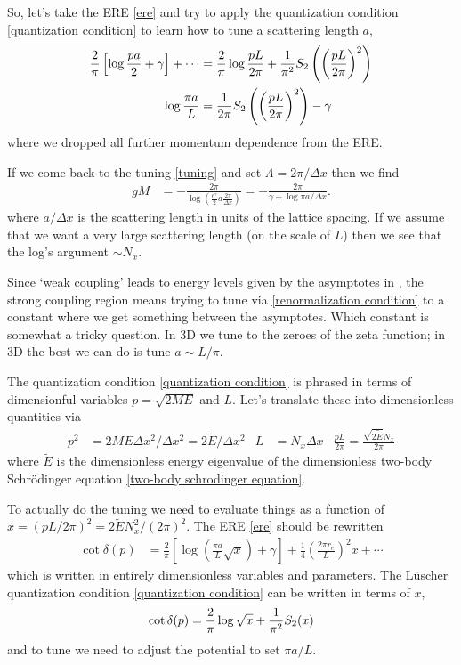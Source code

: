 So, let's take the ERE \eqref{ere} and try to apply the quantization condition \eqref{quantization condition} to learn how to tune a scattering length $a$,
\begin{align}
	\frac{2}{\pi} \left[\log\frac{pa}{2} + \gamma \right] + \cdots
	&=
	\frac{2}{\pi} \log \frac{pL}{2\pi} + \frac{1}{\pi^2} S_2\left(\left(\frac{pL}{2\pi}\right)^2\right)
	\\
	\log \frac{\pi a}{L} &= \frac{1}{2\pi} S_2\left(\left(\frac{pL}{2\pi}\right)^2\right) - \gamma
	\label{eq:renormalization condition}
\end{align}
where we dropped all further momentum dependence from the ERE.

If we come back to the tuning \eqref{tuning} and set $\Lambda=2\pi/\Delta x$ then we find
\begin{align}
	gM
	&= - \frac{2\pi}{\log\left(\frac{e^\gamma}{2} a \frac{2\pi}{\Delta x}\right)}
	= -\frac{2\pi}{\gamma + \log \pi a / \Delta x}.
\end{align}
where $a/\Delta x$ is the scattering length in units of the lattice spacing.
If we assume that we want a very large scattering length (on the scale of $L$) then we see that the log's argument $\sim N_x$.

Since `weak coupling' leads to energy levels given by the asymptotes in , the strong coupling region means trying to tune via \eqref{renormalization condition} to a constant where we get something between the asymptotes.
Which constant is somewhat a tricky question.
In 3D we tune to the zeroes of the zeta function; in 3D the best we can do is tune $a \sim L/\pi$.

The quantization condition \eqref{quantization condition} is phrased in terms of dimensionful variables $p=\sqrt{2ME}$ and $L$.
Let's translate these into dimensionless quantities via
\begin{align}
    p^2 &= 2 M E \Delta x^2 / \Delta x^2 = 2 \tilde{E} / \Delta x^2
	&
	L &= N_x \Delta x
    &
    \frac{pL}{2\pi} = \frac{\sqrt{2\tilde{E}} N_x}{2\pi}
\end{align}
where $\tilde{E}$ is the dimensionless energy eigenvalue of the dimensionless two-body Schr\"{o}dinger equation \eqref{two-body schrodinger equation}.

To actually do the tuning we need to evaluate things as a function of $x=(pL/2\pi)^2=2\tilde{E}N_x^2 / (2\pi)^2$.
The ERE \eqref{ere} should be rewritten
\begin{align}
    \cot \delta(p)
    &=
    \frac{2}{\pi}\left[ \log\left(\frac{\pi a}{L} \sqrt{x}\right)+ \gamma\right]
    +
    \frac{1}{4} \left(\frac{2\pi r_e }{L}\right)^2 x
    +
    \cdots
    \label{eq:ere dimensionless}
\end{align}
which is written in entirely dimensionless variables and parameters.
The L\"{u}scher quantization condition \eqref{quantization condition} can be written in terms of $x$,
\begin{align}
    \cot \delta(p) = \frac{2}{\pi} \log \sqrt{x} + \frac{1}{\pi^2} S_2(x)
\end{align}
and to tune we need to adjust the potential to set $\pi a/L$.

